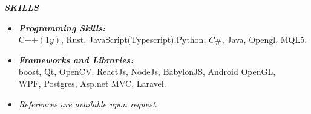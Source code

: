 \documentclass{article}
\newcommand{\hhh}[1]{\Large{\textit{\textbf{#1}}}}
\newcommand{\h}[1]{\normalsize{\textit{\textbf{#1}}}}
\begin{document}
\vspace{.3cm}
 \centerline{\hhh{SKILLS}}
\vspace{-.5cm}
\begin{itemize}
 \setlength{\itemsep}{3pt} \setlength{\parskip}{0pt} \setlength{\parsep}{0pt}
 \item \h{Programming Skills:} \\
 C++$(1y)$, Rust, JavaScript(Typescript),Python, $C\#$, Java, Opengl, MQL5.
 \item \h{Frameworks and Libraries:} \\
 boost, Qt, OpenCV, ReactJs, NodeJs, BabylonJS, Android OpenGL, \\
 WPF, Postgres, Asp.net MVC, Laravel.
\end{itemize}

\begin{itemize}
 \item \textit{References are available upon request.}
\end{itemize}
\end{document}
